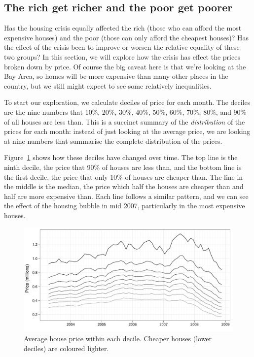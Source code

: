 \documentclass[oneside]{article}
\begin{document}
\subsection{The rich get richer and the poor get poorer}

Has the housing crisis equally affected the rich (those who can afford the most expensive houses) and the poor (those can only afford the cheapest houses)?  Has the effect of the crisis been to improve or worsen the relative equality of these two groups?  In this section, we will explore how the crisis has effect the prices broken down by price.  Of course the big caveat here is that we're looking at the Bay Area, so homes will be more expensive than many other places in the country, but we still might expect to see some relatively inequalities.

To start our exploration, we calculate deciles of price for each month.  The deciles are the nine numbers that 10\%, 20\%, 30\%, 40\%, 50\%, 60\%, 70\%, 80\%, and 90\% of all houses are less than.  This is a succinct summary of the {\it distribution} of the prices for each month: instead of just looking at the average price, we are looking at nine numbers that summarise the complete distribution of the prices.

Figure~\ref{fig:decile-raw} shows how these deciles have changed over time.  The top line is the ninth decile, the price that 90\% of houses are less than, and the bottom line is the first decile, the price that only 10\% of houses are cheaper than.  The line in the middle is the median, the price which half the houses are cheaper than and half are more expensive than.  Each line follows a similar pattern, and we can see the effect of the housing bubble in mid 2007, particularly in the most expensive houses.  

\begin{figure}[htbp]
  \centering
  \includegraphics[width=0.75\linewidth]{decile-raw}
  \caption{Average house price within each decile.  Cheaper houses (lower deciles) are coloured lighter.} 
  \label{fig:decile-raw}
\end{figure}
\end{document}
